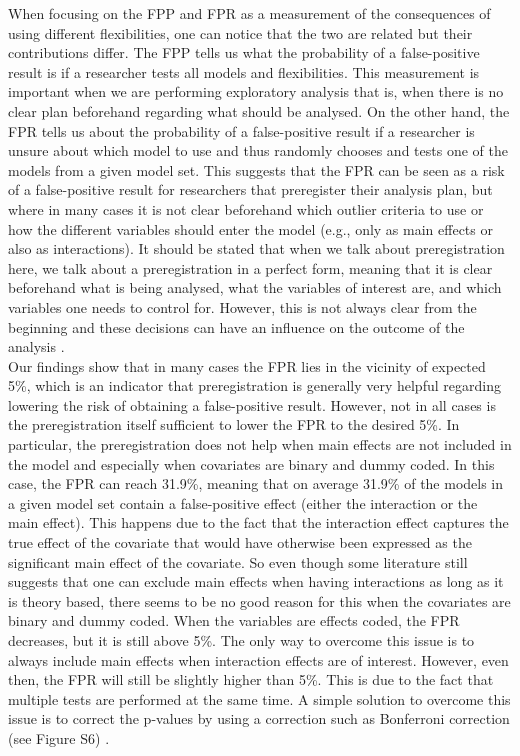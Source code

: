 When focusing on the FPP and FPR as a measurement of the consequences of using different flexibilities, one can notice that the two are related but their contributions differ. The FPP tells us what the probability of a false-positive result is if a researcher tests all models and flexibilities. This measurement is important when we are performing exploratory analysis that is, when there is no clear plan beforehand regarding what should be analysed. On the other hand, the FPR tells us about the probability of a false-positive result if a researcher is unsure about which model to use and thus randomly chooses and tests one of the models from a given model set. This suggests that the FPR can be seen as a risk of a false-positive result for researchers that preregister their analysis plan, but where in many cases it is not clear beforehand which outlier criteria to use or how the different variables should enter the model (e.g., only as main effects or also as interactions).
It should be stated that when we talk about preregistration here, we talk about a preregistration in a perfect form, meaning that it is clear beforehand what is being analysed, what the variables of interest are, and which variables one needs to control for. However, this is not always clear from the beginning and these decisions can have an influence on the outcome of the analysis \citep{Bryan25535,gilbert2016comment}.\\ 

Our findings show that in many cases the FPR lies in the vicinity of expected 5\%, which is an indicator that preregistration is generally very helpful regarding lowering the risk of obtaining a false-positive result. However, not in all cases is the preregistration itself sufficient to lower the FPR to the desired 5\%. In particular, the preregistration does not help when main effects are not included in the model and especially when covariates are binary and dummy coded. In this case, the FPR can reach 31.9\%, meaning that on average 31.9\% of the models in a given model set contain a false-positive effect (either the interaction or the main effect). This happens due to the fact that the interaction effect captures the true effect of the covariate that would have otherwise been expressed as the significant main effect of the covariate. So even though some literature still suggests that one can exclude main effects when having interactions as long as it is theory based, there seems to be no good reason for this when the covariates are binary and dummy coded. When the variables are effects coded, the FPR decreases, but it is still above 5\%. The only way to overcome this issue is to always include main effects when interaction effects are of interest. However, even then, the FPR will still be slightly higher than 5\%. This is due to the fact that multiple tests are performed at the same time. A simple solution to overcome this issue is to correct the p-values by using a correction such as Bonferroni correction (see Figure S6) \citep{dunn1961multiple}. \\

